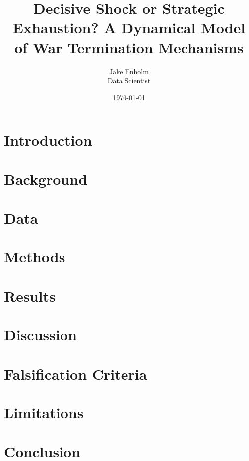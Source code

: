 \documentclass[12pt,a4paper]{article}
\title{Decisive Shock or Strategic Exhaustion? A Dynamical Model of War Termination Mechanisms}
\author{
  Jake Enholm\\
  Data Scientist
}
\date{\today}
\begin{document}
\maketitle



\section{Introduction}
\label{sec:introduction}

\clearpage

\section{Background}
\label{sec:background}

\clearpage

\section{Data}
\label{sec:data}

\clearpage

\section{Methods}
\label{sec:methods}

\clearpage

\section{Results}
\label{sec:results}

\clearpage

\section{Discussion}
\label{sec:discussion}

\clearpage

\section{Falsification Criteria}
\label{sec:falsification_section}

\clearpage

\section{Limitations}
\label{sec:limitations}

\clearpage

\section{Conclusion}
\label{sec:conclusion}

\clearpage




\appendix


\end{document}
